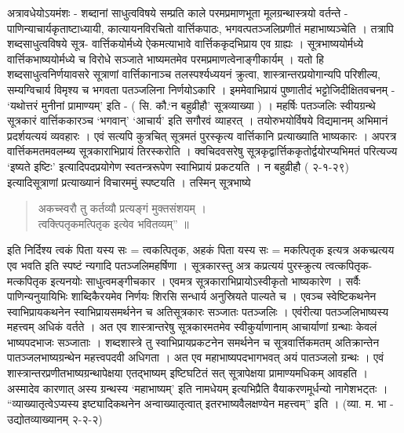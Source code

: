 {अत्रावधेयोऽयमंशः - शब्दानां साधुत्वविषये सम्प्रति काले परमप्रमाणभूता मूलग्रन्थास्त्रयो वर्तन्ते - पाणिन्याचार्यकृताष्टाध्यायी, कात्यायनविरचितो वार्त्तिकपाठः, भगवत्पतञ्जलिप्रणीतं महाभाष्यञ्चेति । तत्रापि शब्दसाधुत्वविषये सूत्र- वार्त्तिकयोर्मध्ये ऐकमत्याभावे वार्त्तिककृदभिप्राय एव ग्राह्यः । सूत्रभाष्ययोर्मध्ये वार्त्तिकभाष्ययोर्मध्ये च विरोधे सञ्जाते भाष्यमतमेव परमप्रमाणत्वेनाङ्गीकार्यम् । यतो हि शब्दसाधुत्वनिर्णयावसरे सूत्राणां वार्त्तिकानाञ्च तलस्पर्श्यध्ययनं क्रुत्वा, शास्त्रान्तरप्रयोगान्यपि परिशील्य, सम्यग्विचार्य विमृश्य च भगवता पतञ्जलिना निर्णयोऽकारि । इममेवाभिप्रायं पुष्णातीदं भट्टोजिदीक्षितवचनम् - ‘यथोत्तरं मुनीनां प्रामाण्यम्’ इति - ( सि. कौ.‘न बहुव्रीहौ’ सूत्रव्याख्या ) । महर्षिः पतञ्जलिः स्वीयग्रन्थे सूत्रकारं वार्त्तिककारञ्च ‘भगवान्’ ‘आचार्य’ इति सगौरवं व्याहरत् । तयोरुभयोर्विषये विद्यमानम् अभिमानं प्रदर्शयत्ययं व्यवहारः । एवं सत्यपि कुत्रचित् सूत्रमतं पुरस्कृत्य वार्त्तिकानि प्रत्याख्याति भाष्यकारः । अपरत्र वार्त्तिकमतमवलम्ब्य सूत्रकाराभिप्रायं तिरस्करोति । क्वचिदवसरेषु सूत्रकृद्वार्त्तिककृतोर्द्वयोरप्यभिमतं परित्यज्य ‘इष्यते इष्टिः’ इत्यादिपदप्रयोगेण स्वतन्त्ररूपेण स्वाभिप्रायं प्रकटयति । न बहुव्रीहौ ( २-१-२९) इत्यादिसूत्राणां प्रत्याख्यानं विचारममुं स्पष्टयति । तस्मिन् सूत्रभाष्ये
\begin{verse}
अकच्स्वरौ तु कर्तव्यौ प्रत्यङ्गं मुक्तसंशयम् ।\\
त्वक्त्पितृकमत्पितृक इत्येव भवितव्यम्” ॥
\end{verse}
इति निर्दिश्य त्वकं पिता यस्य सः = त्वकत्पितृक, अहकं पिता यस्य सः = मकत्पितृक इत्यत्र अकच्प्रत्यय एव भवति इति स्पष्टं न्यगादि पतञ्जलिमहर्षिणा । सूत्रकारस्तु अत्र कप्रत्ययं पुरस्क्रुत्य त्वत्कपितृक-मत्कपितृक इत्यनयोः साधुत्वमङ्गीचकार । एवमत्र सूत्रकाराभिप्रायोऽस्वीकृतो भाष्यकारेण । सर्वैः पाणिन्यनुयायिभिः शाब्दिकैरयमेव निर्णयः शिरसि सन्धार्य अनुस्रियते पाल्यते च । एवञ्च स्वेष्टिकथनेन स्वाभिप्रायकथनेन स्वाभिप्रायसमर्थनेन च अतिसूत्रकारः सञ्जातः पतञ्जलिः । एवंरीत्या पतञ्जलिभाष्यस्य महत्त्वम् अधिकं वर्तते । अत एव शास्त्रान्तरेषु सूत्रकारमतमेव स्वीकुर्याणानाम् आचार्याणां ग्रन्थाः केवलं भाष्यपदभाजः सञ्जाताः । शब्दशास्त्रे तु स्वाभिप्रायप्रकटनेन समर्थनेन च सूत्रवार्त्तिकमतम् अतिक्रान्तेन पातञ्जलभाष्यग्रन्थेन महत्त्वपदवी अधिगता । अत एव महाभाष्यपदभागभवत् अयं पातञ्जलो ग्रन्थः । एवं शास्त्रान्तरप्रणीतभाष्यग्रन्थापेक्षया एतद्भाष्यम् इष्टिघटितं सत् सूत्रापेक्षया प्रामाण्यमधिकम् आवहति । अस्मादेव कारणात् अस्य ग्रन्थस्य ‘महाभाष्यम्’ इति नामधेयम् इत्यभिप्रैति वैयाकरणमूर्धन्यो नागेशभट्तः । “व्याख्यातृत्वेऽप्यस्य इष्ट्यादिकथनेन अन्वाख्यातृत्वात् इतरभाष्यवैलक्षण्येन महत्त्वम्” इति । (व्या. म. भा - उद्योतव्याख्यानम् २-२-२)

}
